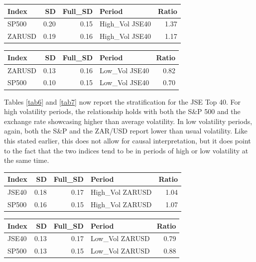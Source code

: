 \documentclass[11pt,preprint, authoryear]{elsarticle}
\let\origtable\table
\let\endorigtable\endtable
\renewenvironment{table}[1][2] {
    \expandafter\origtable\expandafter[H]
} {
    \endorigtable
}
\numberwithin{equation}{section}
\numberwithin{figure}{section}
\numberwithin{table}{section}
\begin{document}
\begin{table}[H]
\centering
\caption{JSE Top 40 High Volatility \label{tab6}} 
\begin{tabular}{lrrlr}
  \hline
Index & SD & Full\_SD & Period & Ratio \\ 
  \hline
SP500 & 0.20 & 0.15 & High\_Vol JSE40 & 1.37 \\ 
  ZARUSD & 0.19 & 0.16 & High\_Vol JSE40 & 1.17 \\ 
   \hline
\end{tabular}
\end{table}
\begin{table}[H]
\centering
\caption{JSE Top 40 Low Volatility \label{tab7}} 
\begin{tabular}{lrrlr}
  \hline
Index & SD & Full\_SD & Period & Ratio \\ 
  \hline
ZARUSD & 0.13 & 0.16 & Low\_Vol JSE40 & 0.82 \\ 
  SP500 & 0.10 & 0.15 & Low\_Vol JSE40 & 0.70 \\ 
   \hline
\end{tabular}
\end{table}

Tables \ref{tab6} and \ref{tab7} now report the stratification for the
JSE Top 40. For high volatility periods, the relationship holds with
both the S\&P 500 and the exchange rate showcasing higher than average
volatility. In low volatility periods, again, both the S\&P and the
ZAR/USD report lower than usual volatility. Like this stated earlier,
this does not allow for causal interpretation, but it does point to the
fact that the two indices tend to be in periods of high or low
volatility at the same time.

\begin{table}[H]
\centering
\caption{ZAR/USD High Volatility \label{tab8}} 
\begin{tabular}{lrrlr}
  \hline
Index & SD & Full\_SD & Period & Ratio \\ 
  \hline
JSE40 & 0.18 & 0.17 & High\_Vol ZARUSD & 1.04 \\ 
  SP500 & 0.16 & 0.15 & High\_Vol ZARUSD & 1.07 \\ 
   \hline
\end{tabular}
\end{table}
\begin{table}[H]
\centering
\caption{ZAR/USD Low Volatility \label{tab9}} 
\begin{tabular}{lrrlr}
  \hline
Index & SD & Full\_SD & Period & Ratio \\ 
  \hline
JSE40 & 0.13 & 0.17 & Low\_Vol ZARUSD & 0.79 \\ 
  SP500 & 0.13 & 0.15 & Low\_Vol ZARUSD & 0.88 \\ 
   \hline
\end{tabular}
\end{table}
\end{document}

